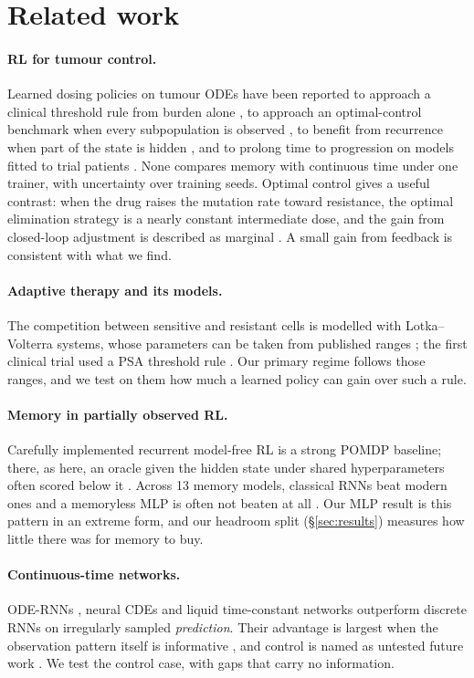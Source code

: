 \documentclass[10pt]{article}
\renewcommand{\cite}{\citep}  %
\begin{document}
\section{Related work}
\paragraph{RL for tumour control.} Learned dosing policies on tumour ODEs have
been reported to approach a clinical threshold rule from burden alone
\cite{gallagher2024}, to approach an optimal-control benchmark when every
subpopulation is observed \cite{kidane2026}, to benefit from recurrence when part
of the state is hidden \cite{kiram2026}, and to prolong time to progression on
models fitted to trial patients \cite{lu2024}. None compares memory with
continuous time under one trainer, with uncertainty over training seeds. Optimal
control gives a useful contrast: when the drug raises the mutation rate toward
resistance, the optimal elimination strategy is a nearly constant intermediate
dose, and the gain from closed-loop adjustment is described as marginal
\cite{kuosmanen2021}. A small gain from feedback is consistent with what we find.
\paragraph{Adaptive therapy and its models.} The competition between sensitive
and resistant cells is modelled with Lotka--Volterra systems, whose parameters
can be taken from published ranges \cite{strobl2021}; the first clinical trial
used a PSA threshold rule \cite{zhang2017}. Our primary regime follows those
ranges, and we test on them how much a learned policy can gain over such a rule.
\paragraph{Memory in partially observed RL.} Carefully implemented recurrent
model-free RL is a strong POMDP baseline; there, as here, an oracle given the
hidden state under shared hyperparameters often scored below it \cite{ni2022}.
Across 13 memory models, classical RNNs beat modern ones and a memoryless MLP is
often not beaten at all \cite{morad2023}. Our MLP result is this pattern in an
extreme form, and our headroom split (\S\ref{sec:results}) measures how little
there was for memory to buy.
\paragraph{Continuous-time networks.} ODE-RNNs \cite{rubanova2019}, neural CDEs
\cite{kidger2020} and liquid time-constant networks \cite{hasani2021} outperform
discrete RNNs on irregularly sampled \emph{prediction}. Their advantage is
largest when the observation pattern itself is informative
\cite{rubanova2019,kidger2020}, and control is named as untested future work
\cite{hasani2021}. We test the control case, with gaps that carry no information.
\end{document}
